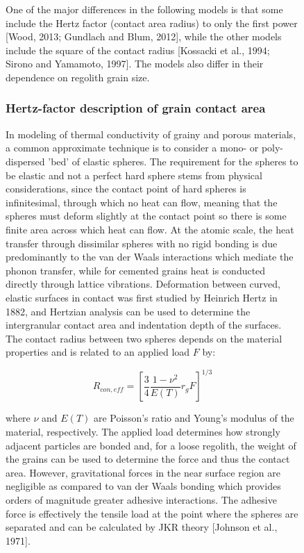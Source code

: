 \documentclass[11pt]{article} %
\begin{document}
\begin{figure}[ht]
	
	One of the major differences in the following models is that some include the Hertz factor (contact area radius) to only the first power [Wood, 2013; Gundlach and Blum, 2012], while the other models include the square of the contact radius [Kossacki et al., 1994; Sirono and Yamamoto, 1997]. The models also differ in their dependence on regolith grain size. 

\subsubsection{Hertz-factor description of grain contact area}
	In modeling of thermal conductivity of grainy and porous materials, a common approximate technique is to consider a mono- or poly-dispersed 'bed' of elastic spheres. The requirement for the spheres to be elastic and not a perfect hard sphere stems from physical considerations, since the contact point of hard spheres is infinitesimal, through which no heat can flow, meaning that the spheres must deform slightly at the contact point so there is some finite area across which heat can flow. At the atomic scale, the heat transfer through dissimilar spheres with no rigid bonding is due predominantly to the van der Waals interactions which mediate the phonon transfer, while for cemented grains heat is conducted directly through lattice vibrations. Deformation between curved, elastic surfaces in contact was first studied by Heinrich Hertz in 1882, and Hertzian analysis can be used to determine the intergranular contact area and indentation depth of the surfaces. The contact radius between two spheres depends on the material properties and is related to an applied load $F$ by:

	\begin{equation}
	R_{con,eff} = \left[ \frac{3}{4} \frac{1 - \nu^{2}}{E(T)} r_{g} F \right]^{1/3}
	\end{equation}

	where $\nu$ and $E(T)$ are Poisson's ratio and Young's modulus of the material, respectively. The applied load determines how strongly adjacent particles are bonded and, for a loose regolith, the weight of the grains can be used to determine the force and thus the contact area. However, gravitational forces in the near surface region are negligible as compared to van der Waals bonding which provides orders of magnitude greater adhesive interactions. The adhesive force is effectively the tensile load at the point where the spheres are separated and can be calculated by JKR theory [Johnson et al., 1971].
	 

\end{figure}
\end{document}

